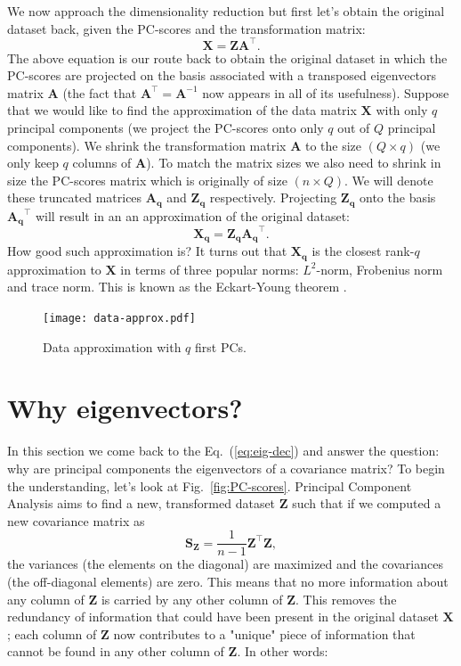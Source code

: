 \documentclass[10pt,twocolumn]{article}
\begin{document}
We now approach the dimensionality reduction but first let's obtain the original dataset back, given the PC-scores and the transformation matrix:
\begin{equation} \label{eq:X-retrieval}
\mathbf{X} = \mathbf{Z} \mathbf{A}^{\top}.
\end{equation}
The above equation is our route back to obtain the original dataset in which the PC-scores are projected on the basis associated with a transposed eigenvectors matrix $\mathbf{A}$ (the fact that $\mathbf{A}^{\top} = \mathbf{A}^{-1}$ now appears in all  of its usefulness).
Suppose that we would like to find the approximation of the data matrix $\mathbf{X}$ with only $q$ principal components (we project the PC-scores onto only $q$ out of $Q$ principal components).
We shrink the transformation matrix $\mathbf{A}$ to the size $(Q \times q)$ (we only keep $q$ columns of $\mathbf{A}$). To match the matrix sizes we also need to shrink in size the PC-scores matrix which is originally of size $(n \times Q)$. We will denote these truncated matrices $\mathbf{A_q}$ and $\mathbf{Z_q}$ respectively.
Projecting $\mathbf{Z_q}$ onto the basis $\mathbf{A_q}^{\top}$ will result in an an approximation of the original dataset:
\begin{equation} \label{eq:X-approximation}
\mathbf{X_q} = \mathbf{Z_q} \mathbf{A_q}^{\top}.
\end{equation}
How good such approximation is? It turns out that $\mathbf{X_q}$ is the closest rank-$q$ approximation to $\mathbf{X}$ in terms of three popular norms: $L^2$-norm, Frobenius norm and trace norm. This is known as the Eckart-Young theorem \cite{eckart-young}.
\begin{figure}[t]
\centering\texttt{[image: data-approx.pdf]}
\caption{Data approximation with $q$ first PCs.}
\label{fig:data-approx}
\end{figure}

\section{Why eigenvectors?}

In this section we come back to the Eq.~(\ref{eq:eig-dec}) and answer the question: why are principal components the eigenvectors of a covariance matrix? 
To begin the understanding, let's look at Fig.~\ref{fig:PC-scores}. Principal Component Analysis aims to find a new, transformed dataset $\mathbf{Z}$ such that if we computed a new covariance matrix as
\begin{equation}
\mathbf{S_Z} =  \frac{1}{n-1} \mathbf{Z}^{\top} \mathbf{Z},
\end{equation}
the variances (the elements on the diagonal) are maximized and the covariances (the off-diagonal elements) are zero. This means that no more information about any column of $\mathbf{Z}$ is carried by any other column of $\mathbf{Z}$. This removes the redundancy of information that could have been present in the original dataset $\mathbf{X}$; each column of $\mathbf{Z}$ now contributes to a "unique" piece of information that cannot be found in any other column of $\mathbf{Z}$. In other words:
\end{document}
